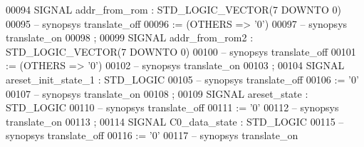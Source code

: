 \begin{DoxyCode}
{00094      \textcolor{keywordflow}{SIGNAL}  \textcolor{vhdlchar}{addr_from_rom}  \textcolor{vhdlchar}{:}   \textcolor{comment}{STD\_LOGIC\_VECTOR}\textcolor{vhdlchar}{(}\textcolor{vhdllogic}{}\textcolor{vhdllogic}{7} \textcolor{keywordflow}{DOWNTO} \textcolor{vhdllogic}{}\textcolor{vhdllogic}{0}\textcolor{vhdlchar}{)}
00095 \textcolor{keyword}{     -- synopsys translate\_off}
00096       \textcolor{vhdlchar}{:=} \textcolor{vhdlchar}{(}\textcolor{keywordflow}{OTHERS} \textcolor{vhdlchar}{=}\textcolor{vhdlchar}{>} \textcolor{vhdlchar}{'}\textcolor{vhdllogic}{}\textcolor{vhdllogic}{0}\textcolor{vhdlchar}{'}\textcolor{vhdlchar}{)}
00097 \textcolor{keyword}{     -- synopsys translate\_on}
00098      ;
00099      \textcolor{keywordflow}{SIGNAL}  \textcolor{vhdlchar}{addr_from_rom2} \textcolor{vhdlchar}{:}   \textcolor{comment}{STD\_LOGIC\_VECTOR}\textcolor{vhdlchar}{(}\textcolor{vhdllogic}{}\textcolor{vhdllogic}{7} \textcolor{keywordflow}{DOWNTO} \textcolor{vhdllogic}{}\textcolor{vhdllogic}{0}\textcolor{vhdlchar}{)}
00100 \textcolor{keyword}{     -- synopsys translate\_off}
00101       \textcolor{vhdlchar}{:=} \textcolor{vhdlchar}{(}\textcolor{keywordflow}{OTHERS} \textcolor{vhdlchar}{=}\textcolor{vhdlchar}{>} \textcolor{vhdlchar}{'}\textcolor{vhdllogic}{}\textcolor{vhdllogic}{0}\textcolor{vhdlchar}{'}\textcolor{vhdlchar}{)}
00102 \textcolor{keyword}{     -- synopsys translate\_on}
00103      ;
00104      \textcolor{keywordflow}{SIGNAL}  \textcolor{vhdlchar}{areset_init_state_1}    \textcolor{vhdlchar}{:}   \textcolor{comment}{STD\_LOGIC}
00105 \textcolor{keyword}{     -- synopsys translate\_off}
00106       \textcolor{vhdlchar}{:=} \textcolor{vhdlchar}{'}\textcolor{vhdllogic}{}\textcolor{vhdllogic}{0}\textcolor{vhdlchar}{'}
00107 \textcolor{keyword}{     -- synopsys translate\_on}
00108      ;
00109      \textcolor{keywordflow}{SIGNAL}  \textcolor{vhdlchar}{areset_state}   \textcolor{vhdlchar}{:}   \textcolor{comment}{STD\_LOGIC}
00110 \textcolor{keyword}{     -- synopsys translate\_off}
00111       \textcolor{vhdlchar}{:=} \textcolor{vhdlchar}{'}\textcolor{vhdllogic}{}\textcolor{vhdllogic}{0}\textcolor{vhdlchar}{'}
00112 \textcolor{keyword}{     -- synopsys translate\_on}
00113      ;
00114      \textcolor{keywordflow}{SIGNAL}  \textcolor{vhdlchar}{C0_data_state}  \textcolor{vhdlchar}{:}   \textcolor{comment}{STD\_LOGIC}
00115 \textcolor{keyword}{     -- synopsys translate\_off}
00116       \textcolor{vhdlchar}{:=} \textcolor{vhdlchar}{'}\textcolor{vhdllogic}{}\textcolor{vhdllogic}{0}\textcolor{vhdlchar}{'}
00117 \textcolor{keyword}{     -- synopsys translate\_on}
}
\end{DoxyCode}
